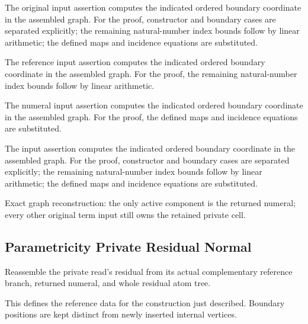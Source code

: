 The original input assertion computes the indicated ordered boundary coordinate in the assembled graph.
For the proof, constructor and boundary cases are separated explicitly; the remaining natural-number index bounds follow by linear arithmetic; the defined maps and incidence equations are substituted.
\par{}

The reference input assertion computes the indicated ordered boundary coordinate in the assembled graph.
For the proof, the remaining natural-number index bounds follow by linear arithmetic.
\par{}

The numeral input assertion computes the indicated ordered boundary coordinate in the assembled graph.
For the proof, the defined maps and incidence equations are substituted.
\par{}

The input assertion computes the indicated ordered boundary coordinate in the assembled graph.
For the proof, constructor and boundary cases are separated explicitly; the remaining natural-number index bounds follow by linear arithmetic; the defined maps and incidence equations are substituted.
\par{}

Exact graph reconstruction: the only active component is the returned numeral; every other original term input still owns the retained private cell.
\par{}

\subsection{Parametricity Private Residual Normal}
Reassemble the private read's residual from its actual complementary reference branch, returned numeral, and whole residual atom tree.

This defines the reference data for the construction just described. Boundary positions are kept distinct from newly inserted internal vertices.
\par{}

